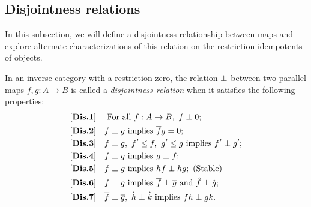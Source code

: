 \subsection{Disjointness relations} %
\label{sub:disjointness_relations}
In this subsection, we will define a disjointness relationship between maps and
explore alternate characterizations of this relation on the restriction idempotents of objects.

\begin{definition}\label{def:disjointness_relation}
  In an inverse category \X with a restriction zero, the relation $\perp$ between two parallel
  maps $f, g:A \to B$ is called a \emph{disjointness relation} when it satisfies the following
  properties:
  \begin{align*}
    \axiom{Dis}{1}\quad &\text{ For all }f:A\to B,\ f\cdperp 0;\\
    \axiom{Dis}{2}\quad &f\cdperp g\text{ implies }\rst{f} g = 0; \\
    \axiom{Dis}{3}\quad &f\cdperp g,\ f' \le f,\ g' \le g\text{ implies }f' \cdperp g';\\
    \axiom{Dis}{4}\quad &f\cdperp g\text{ implies }g \cdperp f;\\
    \axiom{Dis}{5}\quad &f\cdperp g\text{ implies }h f \cdperp h g; \text{ (Stable)}\\
    \axiom{Dis}{6}\quad &f\cdperp g\text{ implies }\rst{f} \cdperp \rst{g}
      \text{ and }\rg{f}\cdperp\rg{g};\\
    \axiom{Dis}{7}\quad &\rst{f}\cdperp \rst{g},\ \rg{h}\cdperp \rg{k}\text{ implies }f h
      \cdperp g k.
  \end{align*}
\end{definition}

